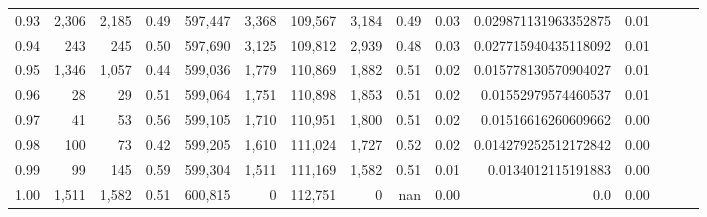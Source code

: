 \begin{tabular}{rrrrrrrrrrrrrrr}
0.93 &   2,306 &   2,185 &  0.49 &  597,447 &    3,368 &  109,567 &    3,184 &  0.49 &  0.03 &  0.029871131963352875 &      0.01 \\
0.94 &     243 &     245 &  0.50 &  597,690 &    3,125 &  109,812 &    2,939 &  0.48 &  0.03 &  0.027715940435118092 &      0.01 \\
0.95 &   1,346 &   1,057 &  0.44 &  599,036 &    1,779 &  110,869 &    1,882 &  0.51 &  0.02 &  0.015778130570904027 &      0.01 \\
0.96 &      28 &      29 &  0.51 &  599,064 &    1,751 &  110,898 &    1,853 &  0.51 &  0.02 &   0.01552979574460537 &      0.01 \\
0.97 &      41 &      53 &  0.56 &  599,105 &    1,710 &  110,951 &    1,800 &  0.51 &  0.02 &   0.01516616260609662 &      0.00 \\
0.98 &     100 &      73 &  0.42 &  599,205 &    1,610 &  111,024 &    1,727 &  0.52 &  0.02 &  0.014279252512172842 &      0.00 \\
0.99 &      99 &     145 &  0.59 &  599,304 &    1,511 &  111,169 &    1,582 &  0.51 &  0.01 &    0.0134012115191883 &      0.00 \\
1.00 &   1,511 &   1,582 &  0.51 &  600,815 &        0 &  112,751 &        0 &   nan &  0.00 &                   0.0 &      0.00 \\
\bottomrule
\end{tabular}
